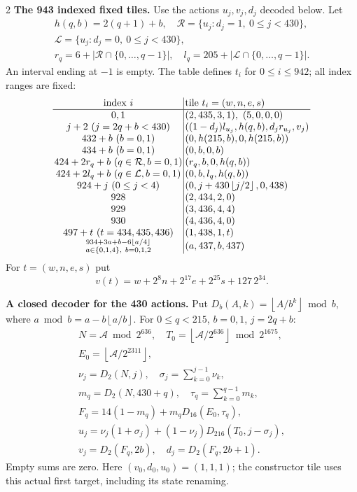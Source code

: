 \documentclass[10pt]{article}
\newcommand{\fl}[1]{\left\lfloor#1\right\rfloor}
\newcommand{\rg}[2]{\{#1,\ldots,#2\}}
\begin{document}
\begin{multicols}{2}
\textbf{The 943 indexed fixed tiles.}
Use the actions $u_j,v_j,d_j$ decoded below. Let
\[
\begin{gathered}
h(q,b)=2(q+1)+b,\quad
\mathcal R=\{u_j:d_j=1,\ 0\le j<430\},\\
\mathcal L=\{u_j:d_j=0,\ 0\le j<430\},\\
r_q=6+|\mathcal R\cap\rg0{q-1}|,\quad
l_q=205+|\mathcal L\cap\rg0{q-1}|.
\end{gathered}
\]
An interval ending at $-1$ is empty. The table defines $t_i$ for
$0\le i\le942$; all index ranges are fixed:
\[
\setlength{\arraycolsep}{1.4pt}\begin{array}{c|l}
\text{index }i&\text{tile }t_i=(w,n,e,s)\\\hline
0,1&(2,435,3,1),\ (5,0,0,0)\\
j+2\ (j=2q+b<430)&((1-d_j)l_{u_j},h(q,b),d_jr_{u_j},v_j)\\
432+b\ (b=0,1)&(0,h(215,b),0,h(215,b))\\
434+b\ (b=0,1)&(0,b,0,b)\\
424+2r_q+b\ (q\in\mathcal R,b=0,1)&(r_q,b,0,h(q,b))\\
424+2l_q+b\ (q\in\mathcal L,b=0,1)&(0,b,l_q,h(q,b))\\
924+j\ (0\le j<4)&(0,j+430\fl{j/2},0,438)\\
928&(2,434,2,0)\\
929&(3,436,4,4)\\
930&(4,436,4,0)\\
497+t\ (t=434,435,436)&(1,438,1,t)\\
\substack{934+3a+b-6\fl{a/4}\\a\in\{0,1,4\},\ b=0,1,2}&(a,437,b,437)
\end{array}
\]
For $t=(w,n,e,s)$ put
\[
v(t)=w+2^8n+2^{17}e+2^{25}s+127\,2^{34}.
\]

\textbf{A closed decoder for the 430 actions.}
Put $D_b(A,k)=\fl{A/b^k}\bmod b$, where
$a\bmod b=a-b\fl{a/b}$. For $0\le q<215$, $b=0,1$, $j=2q+b$:
\[
\begin{gathered}
N=\mathcal A\bmod2^{636},\quad
T_0=\fl{\mathcal A/2^{636}}\bmod2^{1675},\\
E_0=\fl{\mathcal A/2^{2311}},\\
\nu_j=D_2(N,j),\quad \sigma_j=\sum_{k=0}^{j-1}\nu_k,\\
m_q=D_2(N,430+q),\quad \tau_q=\sum_{k=0}^{q-1}m_k,\\
F_q=14(1-m_q)+m_qD_{16}(E_0,\tau_q),\\
u_j=\nu_j(1+\sigma_j)+(1-\nu_j)D_{216}(T_0,j-\sigma_j),\\
v_j=D_2(F_q,2b),\quad d_j=D_2(F_q,2b+1).
\end{gathered}
\]
Empty sums are zero. Here $(v_0,d_0,u_0)=(1,1,1)$; the constructor tile
uses this actual first target, including its state renaming.


\end{multicols}
\end{document}
